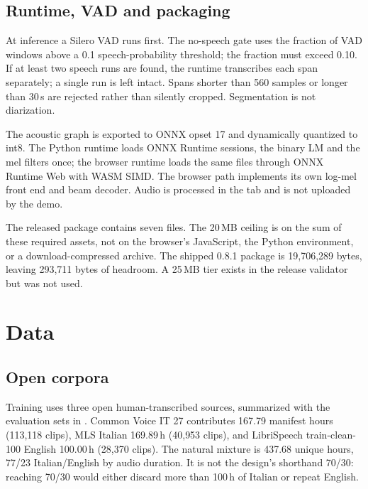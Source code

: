 \documentclass{article}
\begin{document}
\subsection{Runtime, VAD and packaging}

At inference a Silero VAD \citep{silero2021vad} runs first. The no-speech gate uses the fraction
of VAD windows above a 0.1 speech-probability threshold; the fraction must exceed 0.10. If at
least two speech runs are found, the runtime transcribes each span separately; a single run is
left intact. Spans shorter than 560 samples or longer than 30\,s are rejected rather than
silently cropped. Segmentation is not diarization.

The acoustic graph is exported to ONNX opset 17 and dynamically quantized to int8. The Python
runtime loads ONNX Runtime sessions, the binary LM and the mel filters once; the browser runtime
loads the same files through ONNX Runtime Web with WASM SIMD. The browser path implements its own
log-mel front end and beam decoder. Audio is processed in the tab and is not uploaded by the demo.

The released package contains seven files. The 20\,MB ceiling is on the sum of these required
assets, not on the browser's JavaScript, the Python environment, or a download-compressed
archive. The shipped 0.8.1 package is 19{,}706{,}289 bytes, leaving 293{,}711 bytes of headroom.
A 25\,MB tier exists in the release validator but was not used.

\section{Data}
\label{sec:data}

\subsection{Open corpora}

Training uses three open human-transcribed sources, summarized with the evaluation sets in
. Common Voice IT 27 \citep{ardila2020commonvoice} contributes 167.79 manifest
hours (113{,}118 clips), MLS Italian \citep{pratap2020mls} 169.89\,h (40{,}953 clips), and
LibriSpeech train-clean-100 English \citep{panayotov2015librispeech} 100.00\,h (28{,}370 clips).
The natural mixture is 437.68 unique hours, 77/23 Italian/English by audio duration. It is not the
design's shorthand 70/30: reaching 70/30 would either discard more than 100\,h of Italian or
repeat English.
\end{document}
